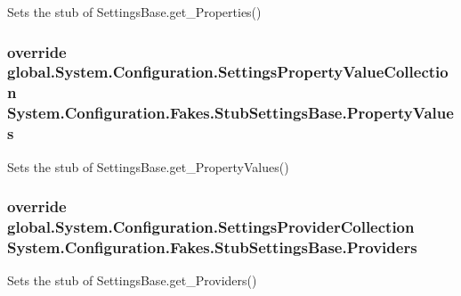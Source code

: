 Sets the stub of Settings\-Base.\-get\-\_\-\-Properties()

\hypertarget{class_system_1_1_configuration_1_1_fakes_1_1_stub_settings_base_a02ce9737d17176dabc82cd00649b77ea}{
\subsubsection[{Property\-Values}]{\setlength{\rightskip}{0pt plus 5cm}override global.\-System.\-Configuration.\-Settings\-Property\-Value\-Collection System.\-Configuration.\-Fakes.\-Stub\-Settings\-Base.\-Property\-Values\hspace{0.3cm}{\ttfamily [get]}}}\label{class_system_1_1_configuration_1_1_fakes_1_1_stub_settings_base_a02ce9737d17176dabc82cd00649b77ea}


Sets the stub of Settings\-Base.\-get\-\_\-\-Property\-Values()

\hypertarget{class_system_1_1_configuration_1_1_fakes_1_1_stub_settings_base_a1dc1e0eabb1f0eec1b530d8dfb0e57d2}{
\subsubsection[{Providers}]{\setlength{\rightskip}{0pt plus 5cm}override global.\-System.\-Configuration.\-Settings\-Provider\-Collection System.\-Configuration.\-Fakes.\-Stub\-Settings\-Base.\-Providers\hspace{0.3cm}{\ttfamily [get]}}}\label{class_system_1_1_configuration_1_1_fakes_1_1_stub_settings_base_a1dc1e0eabb1f0eec1b530d8dfb0e57d2}


Sets the stub of Settings\-Base.\-get\-\_\-\-Providers()

